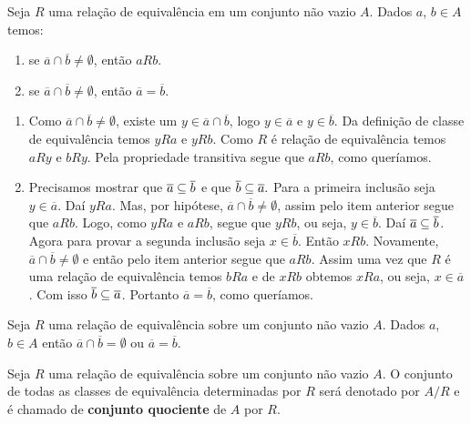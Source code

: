 \begin{proposicao}
    Seja $R$ uma relação de equivalência em um conjunto não vazio $A$. Dados $a$, $b \in A$ temos:
    \begin{enumerate}[label={\roman*})]
        \item se $\overline{a} \cap \overline{b} \ne \emptyset$, então $aRb$.
        \item se  $\overline{a} \cap \overline{b} \neq \emptyset$, então $\overline{a} = \overline{b}$.
    \end{enumerate}
\end{proposicao}
\begin{prova}
    \begin{enumerate}[label={\roman*})]
        \item Como  $\overline{a} \cap \overline{b} \ne \emptyset$, existe um $y \in \overline{a} \cap \overline{b}$, logo $y \in \overline{a}$ e $y \in \overline{b}$. Da definição de classe de equivalência temos $yRa$ e $yRb$. Como $R$ é relação de equivalência temos $aRy$ e $bRy$. Pela propriedade transitiva segue que $aRb$, como queríamos.

        \item Precisamos mostrar que $\overline{a} \subseteq \overline{b}$ e que $\overline{b} \subseteq \overline{a}.$ Para a primeira inclusão seja $y \in \overline{a}$. Daí $yRa$. Mas, por hipótese, $\overline{a}\cap\overline{b}\neq\emptyset$, assim pelo item anterior segue que $aRb$. Logo, como $yRa$ e $aRb$, segue que $yRb$, ou seja, $y \in \overline{b}$. Daí $\overline{a}\subseteq\overline{b}$. Agora para provar a segunda inclusão seja $x \in \overline{b}$. Então $xRb$. Novamente, $\overline{a} \cap \overline{b} \ne \emptyset$ e então pelo item anterior segue que $aRb$. Assim uma vez que $R$ é uma relação de equivalência temos $bRa$ e de $xRb$ obtemos $xRa$, ou seja, $x \in \overline{a}$. Com isso $\overline{b} \subseteq \overline{a}$. Portanto $\overline{a} = \overline{b}$, como queríamos.
    \end{enumerate}
\end{prova}

\begin{corolario}
    Seja $R$ uma relação de equivalência sobre um conjunto não vazio $A$. Dados $a$, $b \in A$ então $\overline{a} \cap \overline{b} = \emptyset$ ou $\overline{a} = \overline{b}$.
\end{corolario}

\begin{definicao}
    Seja $R$ uma relação de equivalência sobre um conjunto não vazio $A$. O conjunto de todas as classes de equivalência determinadas por $R$ ser{\'a} denotado por $A/R$ e é chamado de \textbf{conjunto quociente} de $A$ por $R$.
\end{definicao}

